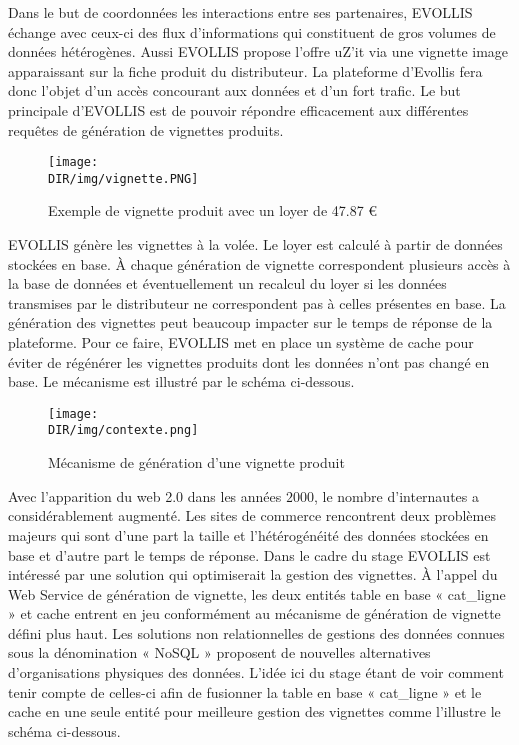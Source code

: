 Dans le but de coordonnées les interactions entre ses partenaires, \textsf{EVOLLIS} 
échange avec ceux-ci des flux d'informations qui constituent de gros volumes de 
données hétérogènes. Aussi \textsf{EVOLLIS} propose l'offre \textsf{uZ'it} via une 
vignette image apparaissant sur la fiche produit du distributeur. La plateforme
d'Evollis fera donc l'objet d'un accès concourant aux données et d'un fort trafic.
Le but principale d'\textsf{EVOLLIS} est de pouvoir répondre efficacement aux 
différentes requêtes de génération de vignettes produits.
\begin {figure}[H]
       \centering
        \texttt{[image: \\DIR/img/vignette.PNG]}	
        \caption{Exemple de vignette produit avec un loyer de 47.87 €}
	\label{sqoop}
  \end {figure}    
\noindent
\textsf{EVOLLIS} génère les vignettes à la volée. Le loyer est calculé à partir de 
données stockées en base. À chaque génération de vignette correspondent plusieurs 
accès à la base de données et éventuellement un recalcul du loyer si les données 
transmises par le distributeur ne correspondent pas à celles présentes en base.
La génération des vignettes peut beaucoup impacter sur le temps de réponse de 
la plateforme. Pour ce faire, \textsf{EVOLLIS} met en place un système de cache
pour éviter de régénérer les vignettes produits dont les données n'ont pas changé en base. 
Le mécanisme est illustré par le schéma ci-dessous.
\begin {figure}[H]
       \centering
        \texttt{[image: \\DIR/img/contexte.png]}	
        \caption{Mécanisme de génération d'une vignette produit}
	\label{sqoop}
  \end {figure}    
\noindent
Avec l'apparition du \textsf{web 2.0} dans les années $2000$, le nombre d'internautes 
a considérablement augmenté. Les sites de commerce rencontrent deux problèmes majeurs
qui sont d'une part la taille et l'hétérogénéité des données stockées en base et d'autre part
le temps de réponse. Dans le cadre du stage \textsf{EVOLLIS} est intéressé par une solution
qui optimiserait la gestion des vignettes. À l'appel du \textsf{Web Service} de génération
de vignette, les deux entités table en base « \textsf{cat\_ligne} » et cache entrent en jeu 
conformément au mécanisme de génération de vignette défini plus haut. Les solutions non 
relationnelles de gestions des données connues sous la dénomination « \textsf{NoSQL} » 
proposent de nouvelles alternatives d'organisations physiques des données. L'idée ici du stage 
étant de voir comment tenir compte de celles-ci afin de fusionner la table en base 
« \textsf{cat\_ligne} » et le cache en une seule entité pour meilleure gestion des vignettes comme
l'illustre le schéma ci-dessous. 

